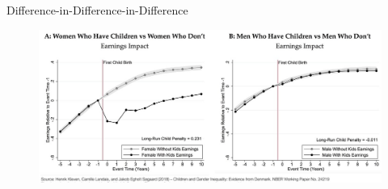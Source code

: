 
    


    

\begin{frame}{Difference-in-Difference-in-Difference}

\begin{figure}
    \centering
    \includegraphics[width=\textwidth]{Images/gender.jpg}
    \label{fig:my_label}
\end{figure}


\end{frame}







